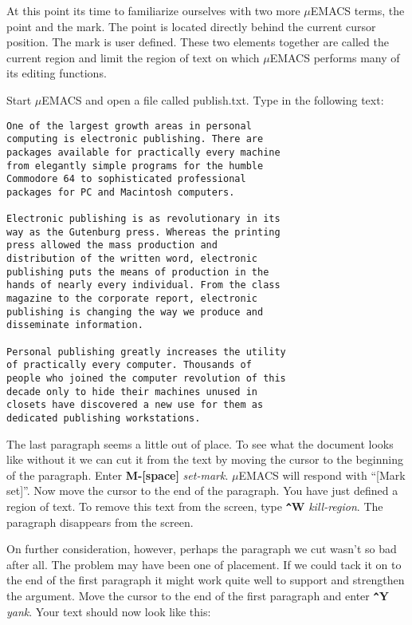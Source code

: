 At this point its time to familiarize ourselves with two more $\mu$EMACS
terms, the point and the mark. The point is located directly behind the
current cursor position. The mark is user defined. These two elements
together are called the current region and limit the region of text on
which $\mu$EMACS performs many of its editing functions.

Start $\mu$EMACS and open a file called publish.txt. Type in the following
text:

\begin{verbatim}
One of the largest growth areas in personal
computing is electronic publishing. There are
packages available for practically every machine
from elegantly simple programs for the humble
Commodore 64 to sophisticated professional
packages for PC and Macintosh computers.

Electronic publishing is as revolutionary in its
way as the Gutenburg press. Whereas the printing
press allowed the mass production and
distribution of the written word, electronic
publishing puts the means of production in the
hands of nearly every individual. From the class
magazine to the corporate report, electronic
publishing is changing the way we produce and
disseminate information.

Personal publishing greatly increases the utility
of practically every computer. Thousands of
people who joined the computer revolution of this
decade only to hide their machines unused in
closets have discovered a new use for them as
dedicated publishing workstations.
\end{verbatim}

The last paragraph seems a little out of place. To see what the
document looks like without it we can cut it from the text by moving
the cursor to the beginning of the paragraph. Enter {\bf M-[space]}
{\it set-mark}. $\mu$EMACS will respond with ``[Mark set]''. Now move
the cursor to the end of the paragraph. You have just defined a region
of text. To remove this text from the screen, type {\bf \verb+^+W} {\it
kill-region}. The paragraph disappears from the screen.

On further consideration, however, perhaps the paragraph we cut wasn't
so bad after all. The problem may have been one of placement. If we
could tack it on to the end of the first paragraph it might work quite
well to support and strengthen the argument. Move the cursor to the end
of the first paragraph and enter {\bf \verb+^+Y} {\it yank}. Your text
should now look like this:

